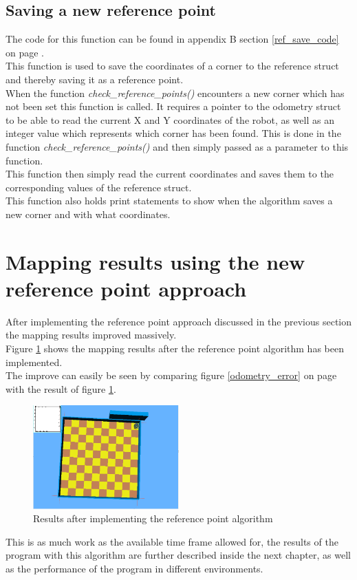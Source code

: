 \subsection{Saving a new reference point}
\label{ref_save_description}
The code for this function can be found in appendix B section \ref{ref_save_code} on page \pageref{ref_save_code}.\\
This function is used to save the coordinates of a corner to the reference struct and thereby saving it as a reference point. \\
When the function \textit{check\_reference\_points()} encounters a new corner which has not been set this function is called. It requires a pointer to the odometry struct to be able to read the current X and Y coordinates of the robot, as well as an integer value which represents which corner has been found. This is done in the function \textit{check\_reference\_points()} and then simply passed as a parameter to this function. \\
This function then simply read the current coordinates and saves them to the corresponding values of the reference struct.\\
This function also holds print statements to show when the algorithm saves a new corner and with what coordinates.

\section{Mapping results using the new reference point approach}
After implementing the reference point approach discussed in the previous section the mapping results improved massively.\\
Figure \ref{ref_result} shows the mapping results after the reference point algorithm has been implemented. \\
The improve can easily be seen by comparing figure \ref{odometry_error} on page \pageref{odometry_error} with the result of figure \ref{ref_result}.

\begin{figure}[h]
\centering
\includegraphics[width = 0.5\textwidth]{../../figures/map_results/result_room1_empty.png}
\caption{Results after implementing the reference point algorithm}
\label{ref_result}
\end{figure}

This is as much work as the available time frame allowed for, the results of the program with this algorithm are further described inside the next chapter, as well as the performance of the program in different environments.